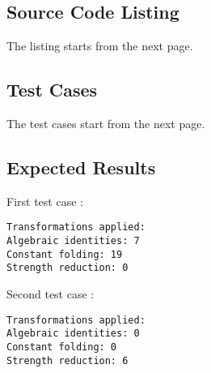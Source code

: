 \subsection{Source Code Listing}

The listing starts from the next page.



\subsection{Test Cases}

The test cases start from the next page.




\subsection{Expected Results}

First test case :
\begin{verbatim}
Transformations applied:
Algebraic identities: 7
Constant folding: 19
Strength reduction: 0
\end{verbatim}
Second test case :
\begin{verbatim}
Transformations applied:
Algebraic identities: 0
Constant folding: 0
Strength reduction: 6
\end{verbatim}


